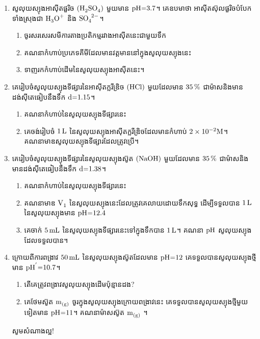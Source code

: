 \documentclass[12pt, a4paper]{article}
\begin{document}
\begin{enumerate}[m]
\begin{enumerate}[k]
 	\end{enumerate}
 	\item សូលុយស្យុងអាសុីតផួរិច $\ce{(H2SO4)}$ មួយមាន $\ce{pH=3.7}$។ គេឧបមាថា អាសុីតស៊ុលផួរិចបំបែកទាំងស្រុងជា $\ce{H3O+}$ និង $\ce{SO4^{2-}}$។
 	\begin{enumerate}[k]
 		\item ចូរសរសេរសមីការតាងប្រតិកម្មរវាងអាសុីតនេះជាមួយទឹក
 		\item គណនាកំហាប់ប្រភេទគីមីដែលមានវត្តមាននៅក្នុងសូលុយស្យុងនេះ
 		\item ទាញរកកំហាប់ដើមនៃសូលុយស្យុងអាសុីតនេះ។
 	\end{enumerate}
 	\item គេរៀបចំសូលុយស្យុងទីផ្សារនៃអាសុីតក្លរីឌ្រិច $\ce{(HCl)}$ មួយដែលមាន $\ce{35\%}$ ជាម៉ាសនិងមានដង់សុីតេធៀបនឹងទឹក $\ce{d=1.15}$។
 	\begin{enumerate}[k]
 		\item គណនាកំហាប់នៃសូលុយស្យុងទីផ្សារនេះ
 		\item គេចង់រៀបចំ $\ce{1L}$ នៃសូលុយស្យុងអាសុីតក្លរីឌ្រិចដែលមានកំហាប់ $2\times10^{-2}\ce{M}$។\\ គណនាមាឌសូលុយស្យុងទីផ្សារដែលត្រូវប្រើ។
 	\end{enumerate}
 	\item គេរៀបចំសូលុយស្យុងទីផ្សារនៃសូលុយស្យុងស៊ូត $\ce{(NaOH)}$ មួយដែលមាន $\ce{35\%}$ ជាម៉ាសនិងមានដង់សុីតេធៀបនឹងទឹក $\ce{d=1.38}$។
 	\begin{enumerate}[k]
 		\item គណនាកំហាប់នៃសូលុយស្យុងទីផ្សារនេះ
 		\item គណនាមាឌ $\ce{V1}$ នៃសូលុយស្យុងនេះដែលត្រូវគេលាយដោយទឹកសុទ្ធ ដើម្បីទទួលបាន $\ce{1L}$ នៃសូលុយស្យុងមាន $\ce{pH=12.4}$
 		\item គេចាក់ $\ce{5mL}$ នៃសូលុយស្យុងទីផ្សារនេះទៅក្នុងទឹកបាន $\ce{1L}$។
 		គណនា $\ce{pH}$ សូលុយស្យុងដែលទទួលបាន។
 	\end{enumerate}
 	\item ក្រោយពីការពង្រាវ $\ce{50mL}$ នៃសូលុយស្យុងស៊ូតដែលមាន $\ce{pH=12}$ គេទទួលបានសូលុយស្យុងថ្មីមាន $\ce{pH^{'}=10.7}$។
 	\begin{enumerate}[k]
 		\item តើគេត្រូវពង្រាវសូលុយស្យុងដើមប៉ុន្មានដង?
 		\item គេថែមស៊ូត $\ce{m_{(g)}}$ ចូរក្នុងសូលុយស្យុងក្រោយពង្រាវនេះ គេទទួលបានសូលុយស្យុងថ្មីមួយទៀតមាន $\ce{pH=11}$។ គណនាម៉ាសស៊ូត $\ce{m_{(g)}}$ ។
 	\end{enumerate}
	\begin{center}
		\sffamily\color{black}
		សូមសំណាងល្អ!
	\end{center}\newpage
\end{enumerate}	
\end{document}

